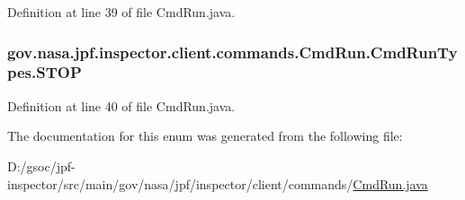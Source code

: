 Definition at line 39 of file Cmd\+Run.\+java.

\subsubsection[{\texorpdfstring{S\+T\+OP}{STOP}}]{\setlength{\rightskip}{0pt plus 5cm}gov.\+nasa.\+jpf.\+inspector.\+client.\+commands.\+Cmd\+Run.\+Cmd\+Run\+Types.\+S\+T\+OP}\hypertarget{enumgov_1_1nasa_1_1jpf_1_1inspector_1_1client_1_1commands_1_1_cmd_run_1_1_cmd_run_types_a1284694759a2df2899bce81991b3e489}{}\label{enumgov_1_1nasa_1_1jpf_1_1inspector_1_1client_1_1commands_1_1_cmd_run_1_1_cmd_run_types_a1284694759a2df2899bce81991b3e489}


Definition at line 40 of file Cmd\+Run.\+java.



The documentation for this enum was generated from the following file\+:\begin{DoxyCompactItemize}
\item 
D\+:/gsoc/jpf-\/inspector/src/main/gov/nasa/jpf/inspector/client/commands/\hyperlink{_cmd_run_8java}{Cmd\+Run.\+java}\end{DoxyCompactItemize}
